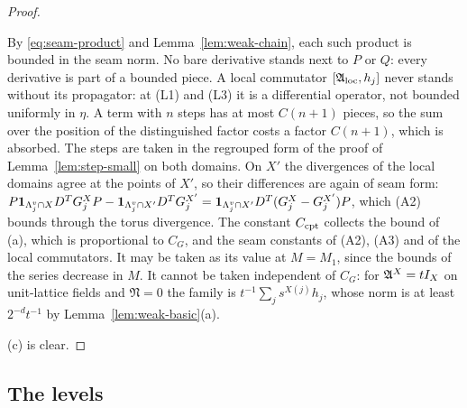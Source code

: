 \begin{proof}
\begin{itemize}
\end{itemize}
By \eqref{eq:seam-product} and Lemma~\ref{lem:weak-chain}, each such product is bounded in the seam norm. No bare derivative stands next to $P$ or $Q$: every derivative is part of a bounded piece. A local commutator $[\mathfrak A_{\rm loc},h_j]$ never stands without its propagator: at (L1) and (L3) it is a differential operator, not bounded uniformly in $\eta$. A term with $n$ steps has at most $C(n+1)$ pieces, so the sum over the position of the distinguished factor costs a factor $C(n+1)$, which is absorbed. The steps are taken in the regrouped form of the proof of Lemma~\ref{lem:step-small} on both domains. On $X'$ the divergences of the local domains agree at the points of $X'$, so their differences are again of seam form: $P\mathbf 1_{\Lambda^v_j\cap X}D^TG^X_jP-\mathbf 1_{\Lambda^v_j\cap X'}D^TG^{X'}_j=\mathbf 1_{\Lambda^v_j\cap X'}D^T(G^X_j-G^{X'}_j)P$, which (A2) bounds through the torus divergence. The constant $C_{\rm cpt}$ collects the bound of (a), which is proportional to $C_G$, and the seam constants of (A2), (A3) and of the local commutators. It may be taken as its value at $M=M_1$, since the bounds of the series decrease in $M$. It cannot be taken independent of $C_G$: for $\mathfrak A^X=tI_X$ on unit-lattice fields and $\mathfrak N=0$ the family is $t^{-1}\sum_js^{X(j)}h_j$, whose norm is at least $2^{-d}t^{-1}$ by Lemma~\ref{lem:weak-basic}(a).

(c) is clear.
\end{proof}

\subsection{The levels}

